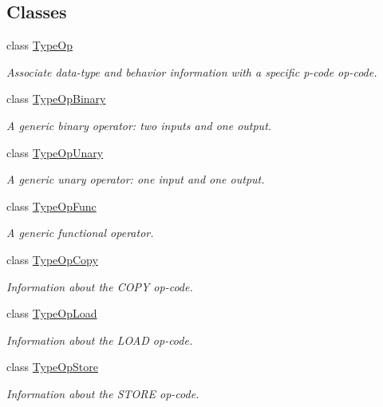 \subsection*{Classes}
\begin{DoxyCompactItemize}
\item 
class \mbox{\hyperlink{class_type_op}{Type\+Op}}
\begin{DoxyCompactList}\small\item\em Associate data-\/type and behavior information with a specific p-\/code op-\/code. \end{DoxyCompactList}\item 
class \mbox{\hyperlink{class_type_op_binary}{Type\+Op\+Binary}}
\begin{DoxyCompactList}\small\item\em A generic binary operator\+: two inputs and one output. \end{DoxyCompactList}\item 
class \mbox{\hyperlink{class_type_op_unary}{Type\+Op\+Unary}}
\begin{DoxyCompactList}\small\item\em A generic unary operator\+: one input and one output. \end{DoxyCompactList}\item 
class \mbox{\hyperlink{class_type_op_func}{Type\+Op\+Func}}
\begin{DoxyCompactList}\small\item\em A generic functional operator. \end{DoxyCompactList}\item 
class \mbox{\hyperlink{class_type_op_copy}{Type\+Op\+Copy}}
\begin{DoxyCompactList}\small\item\em Information about the C\+O\+PY op-\/code. \end{DoxyCompactList}\item 
class \mbox{\hyperlink{class_type_op_load}{Type\+Op\+Load}}
\begin{DoxyCompactList}\small\item\em Information about the L\+O\+AD op-\/code. \end{DoxyCompactList}\item 
class \mbox{\hyperlink{class_type_op_store}{Type\+Op\+Store}}
\begin{DoxyCompactList}\small\item\em Information about the S\+T\+O\+RE op-\/code. \end{DoxyCompactList}\item 

\end{DoxyCompactItemize}
